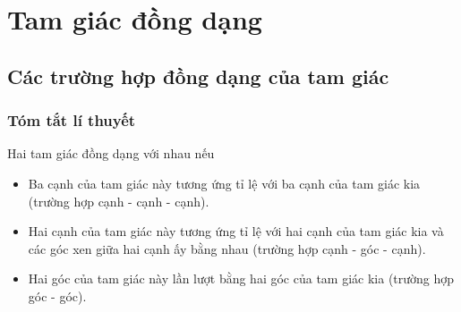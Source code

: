 \chapter{Tam giác đồng dạng}
\section{Các trường hợp đồng dạng của tam giác}
\subsection{Tóm tắt lí thuyết}
\begin{dl}
	Hai tam giác đồng dạng với nhau nếu
	\begin{itemize}
		\item Ba cạnh của tam giác này tương ứng tỉ lệ với ba cạnh của tam giác kia (trường hợp cạnh - cạnh - cạnh).
		\item Hai cạnh của tam giác này tương ứng tỉ lệ với hai cạnh của tam giác kia và các góc xen giữa hai cạnh ấy bằng nhau (trường hợp cạnh - góc - cạnh).
		\item Hai góc của tam giác này lần lượt bằng hai góc của tam giác kia (trường hợp góc - góc).
	\end{itemize}
\end{dl}

